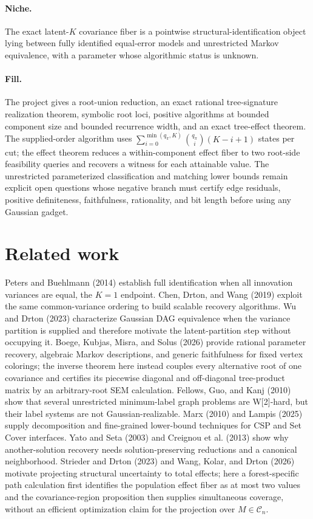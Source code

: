 \documentclass{article}
\begin{document}
\paragraph{Niche.} The exact latent-\(K\) covariance fiber is a pointwise structural-identification object lying between fully identified equal-error models and unrestricted Markov equivalence, with a parameter whose algorithmic status is unknown.

\paragraph{Fill.} The project gives a root-union reduction, an exact rational tree-signature realization theorem, symbolic root loci, positive algorithms at bounded component size and bounded recurrence width, and an exact tree-effect theorem. The supplied-order algorithm uses \(\sum_{i=0}^{\min(q_\pi,K)}\binom{q_\pi}{i}(K-i+1)\) states per cut; the effect theorem reduces a within-component effect fiber to two root-side feasibility queries and recovers a witness for each attainable value. The unrestricted parameterized classification and matching lower bounds remain explicit open questions whose negative branch must certify edge residuals, positive definiteness, faithfulness, rationality, and bit length before using any Gaussian gadget.

\section{Related work}

Peters and Buehlmann (2014) establish full identification when all innovation variances are equal, the \(K=1\) endpoint. Chen, Drton, and Wang (2019) exploit the same common-variance ordering to build scalable recovery algorithms. Wu and Drton (2023) characterize Gaussian DAG equivalence when the variance partition is supplied and therefore motivate the latent-partition step without occupying it. Boege, Kubjas, Misra, and Solus (2026) provide rational parameter recovery, algebraic Markov descriptions, and generic faithfulness for fixed vertex colorings; the inverse theorem here instead couples every alternative root of one covariance and certifies its piecewise diagonal and off-diagonal tree-product matrix by an arbitrary-root SEM calculation. Fellows, Guo, and Kanj (2010) show that several unrestricted minimum-label graph problems are W[2]-hard, but their label systems are not Gaussian-realizable. Marx (2010) and Lampis (2025) supply decomposition and fine-grained lower-bound techniques for CSP and Set Cover interfaces. Yato and Seta (2003) and Creignou et al. (2013) show why another-solution recovery needs solution-preserving reductions and a canonical neighborhood. Strieder and Drton (2023) and Wang, Kolar, and Drton (2026) motivate projecting structural uncertainty to total effects; here a forest-specific path calculation first identifies the population effect fiber as at most two values and the covariance-region proposition then supplies simultaneous coverage, without an efficient optimization claim for the projection over \(M\in\mathcal C_n\).
\end{document}
